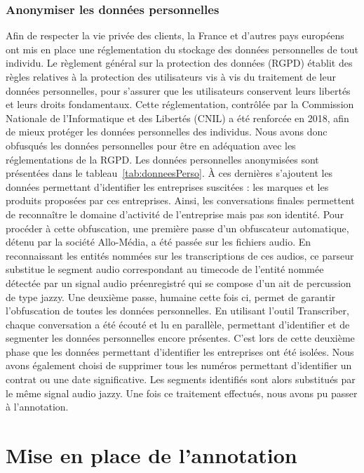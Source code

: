 \subsubsection{Anonymiser les données personnelles}
Afin de respecter la vie privée des clients, la France et d'autres pays européens ont mis en place une réglementation du stockage des données personnelles de tout individu. Le règlement général sur la protection des données (RGPD) établit des règles relatives à la protection des utilisateurs vis à vis du traitement de leur données personnelles, pour s'assurer que les utilisateurs conservent leurs libertés et leurs droits fondamentaux. Cette réglementation, contrôlée par la Commission Nationale de l'Informatique et des Libertés (CNIL) a été renforcée en 2018, afin de mieux protéger les données personnelles des individus.
Nous avons donc obfusqués les données personnelles pour être en adéquation avec les réglementations de la RGPD. Les données personnelles anonymisées sont présentées dans le tableau~\ref{tab:donneesPerso}. À ces dernières s'ajoutent les données permettant d'identifier les entreprises suscitées : les marques et les produits proposées par ces entreprises. Ainsi, les conversations finales permettent de reconnaître le domaine d'activité de l'entreprise mais pas son identité.
Pour procéder à cette obfuscation, une première passe d'un obfuscateur automatique, détenu par la société Allo-Média, a été passée sur les fichiers audio. En reconnaissant les entités nommées sur les transcriptions de ces audios, ce parseur substitue le segment audio correspondant au timecode de l’entité nommée détectée par un signal audio préenregistré qui se compose d'un ait de percussion de type jazzy.
Une deuxième passe, humaine cette fois ci, permet de garantir l'obfuscation de toutes les données personnelles. En utilisant l'outil Transcriber, chaque conversation a été écouté et lu en parallèle, permettant d'identifier et de segmenter les données personnelles encore présentes. C'est lors de cette deuxième phase que les données permettant d'identifier les entreprises ont été isolées. Nous avons également choisi de supprimer tous les numéros permettant d'identifier un contrat ou une date significative.
Les segments identifiés sont alors substitués par le même signal audio jazzy. Une fois ce traitement effectués, nous avons pu passer à l'annotation.

\section{Mise en place de l'annotation}

